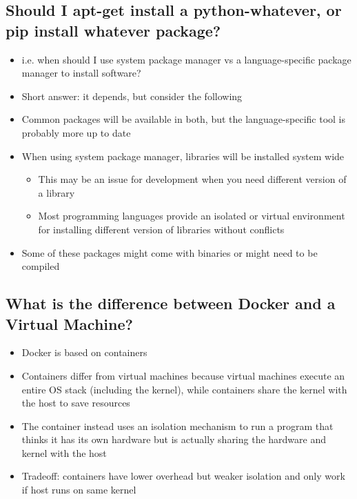 \documentclass[letterpaper,12pt]{article}
\begin{document}
\subsection{Should I apt-get install a python-whatever, or pip install whatever package?}
\begin{itemize}
 \item i.e. when should I use system package manager vs a language-specific package manager to install software?
 \item Short answer: it depends, but consider the following
 \item Common packages will be available in both, but the language-specific tool is probably more up to date
 \item When using system package manager, libraries will be installed system wide
       \begin{itemize}
        \item This may be an issue for development when you need different version of a library
        \item Most programming languages provide an isolated or virtual environment for installing different version of libraries without conflicts
       \end{itemize}
 \item Some of these packages might come with binaries or might need to be compiled
\end{itemize}


\subsection{What is the difference between Docker and a Virtual Machine?}
\begin{itemize}
 \item Docker is based on containers
 \item Containers differ from virtual machines because virtual machines execute an entire OS stack (including the kernel), while containers share the kernel with the host to save resources
 \item The container instead uses an isolation mechanism to run a program that thinks it has its own hardware but is actually sharing the hardware and kernel with the host
 \item Tradeoff: containers have lower overhead but weaker isolation and only work if host runs on same kernel
\end{itemize}
\end{document}
